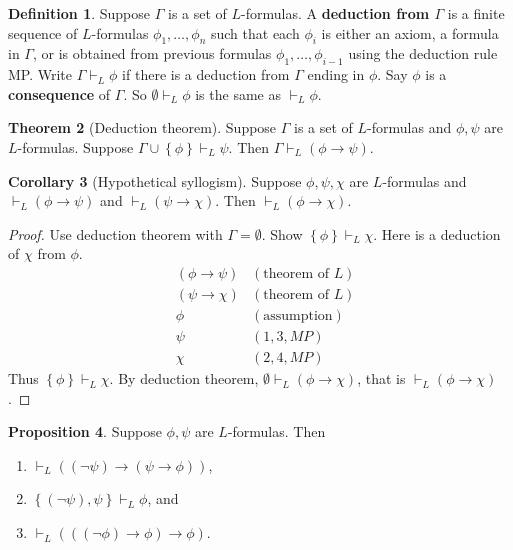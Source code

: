 \documentclass{article}
\newcommand{\rb}[1]{\left( #1 \right)}
\newcommand{\cb}[1]{\left\{ #1 \right\}}
\newcommand{\notb}[1]{\rb{\neg #1}}
\newcommand{\impb}[2]{\rb{#1 \rightarrow #2}}
\theoremstyle{definition}\newtheorem{definition}{Definition}[subsection]
\theoremstyle{definition}\newtheorem{remark}[definition]{Remark}
\theoremstyle{definition}\newtheorem*{example}{Example}
\theoremstyle{definition}\newtheorem*{note}{Note}
\newtheorem{proposition}[definition]{Proposition}
\newtheorem{theorem}[definition]{Theorem}
\newtheorem{corollary}[definition]{Corollary}
\begin{document}

\begin{definition}
Suppose $ \Gamma $ is a set of $ L $-formulas. A \textbf{deduction from $ \Gamma $} is a finite sequence of $ L $-formulas $ \phi_1, \dots, \phi_n $ such that each $ \phi_i $ is either an axiom, a formula in $ \Gamma $, or is obtained from previous formulas $ \phi_1, \dots, \phi_{i - 1} $ using the deduction rule MP. Write $ \Gamma \vdash_L \phi $ if there is a deduction from $ \Gamma $ ending in $ \phi $. Say $ \phi $ is a \textbf{consequence} of $ \Gamma $. So $ \emptyset \vdash_L \phi $ is the same as $ \vdash_L \phi $.
\end{definition}

\begin{theorem}[Deduction theorem]
\label{thm:dt}
Suppose $ \Gamma $ is a set of $ L $-formulas and $ \phi, \psi $ are $ L $-formulas. Suppose $ \Gamma \cup \cb{\phi} \vdash_L \psi $. Then $ \Gamma \vdash_L \impb{\phi}{\psi} $.
\end{theorem}

\begin{corollary}[Hypothetical syllogism]
Suppose $ \phi, \psi, \chi $ are $ L $-formulas and $ \vdash_L \impb{\phi}{\psi} $ and $ \vdash_L \impb{\psi}{\chi} $. Then $ \vdash_L \impb{\phi}{\chi} $.
\end{corollary}

\begin{proof}
Use deduction theorem with $ \Gamma = \emptyset $. Show $ \cb{\phi} \vdash_L \chi $. Here is a deduction of $ \chi $ from $ \phi $.
\begin{align*}
& \impb{\phi}{\psi} & \rb{\text{theorem of } L} \\
& \impb{\psi}{\chi} & \rb{\text{theorem of } L} \\
& \phi & \rb{\text{assumption}} \\
& \psi & \rb{1, 3, MP} \\
& \chi & \rb{2, 4, MP}
\end{align*}
Thus $ \cb{\phi} \vdash_L \chi $. By deduction theorem, $ \emptyset \vdash_L \impb{\phi}{\chi} $, that is $ \vdash_L \impb{\phi}{\chi} $.
\end{proof}

\begin{proposition}
\label{prop:1.2.7}
Suppose $ \phi, \psi $ are $ L $-formulas. Then
\begin{enumerate}
\item $ \vdash_L \impb{\notb{\psi}}{\impb{\psi}{\phi}} $,
\item $ \cb{\notb{\psi}, \psi} \vdash_L \phi $, and
\item $ \vdash_L \impb{\impb{\notb{\phi}}{\phi}}{\phi} $.
\end{enumerate}
\end{proposition}
\end{document}
